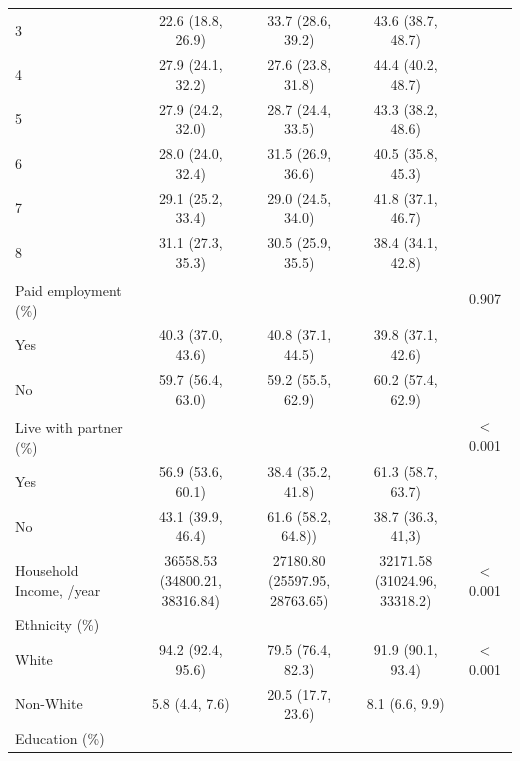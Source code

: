 \begin{table}[H]
\begin{tabular}[t]{lcccc}
	\hspace{1em}3 & 22.6 (18.8, 26.9) & 33.7 (28.6, 39.2) & 43.6 (38.7, 48.7) & \\
	\hspace{1em}4 & 27.9 (24.1, 32.2) & 27.6 (23.8, 31.8) & 44.4 (40.2, 48.7) & \\
	\hspace{1em}5 & 27.9 (24.2, 32.0) & 28.7 (24.4, 33.5) & 43.3 (38.2, 48.6) & \\
	\hspace{1em}6 & 28.0 (24.0, 32.4) & 31.5 (26.9, 36.6) & 40.5 (35.8, 45.3) & \\
	\hspace{1em}7 & 29.1 (25.2, 33.4) & 29.0 (24.5, 34.0) & 41.8 (37.1, 46.7) & \\
	\hspace{1em}8 & 31.1 (27.3, 35.3) & 30.5 (25.9, 35.5) & 38.4 (34.1, 42.8) & \\
	Paid employment\textsuperscript{\dag} (\%) &  &  &  & 0.907\\
	\hspace{1em}Yes & 40.3 (37.0, 43.6) & 40.8 (37.1, 44.5) & 39.8 (37.1, 42.6) & \\
	\hspace{1em}No & 59.7 (56.4, 63.0) & 59.2 (55.5, 62.9) & 60.2 (57.4, 62.9) & \\
	Live with partner\textsuperscript{\ddag} (\%) &  &  &  & < 0.001\\
	\hspace{1em}Yes & 56.9 (53.6, 60.1) & 38.4 (35.2, 41.8) & 61.3 (58.7, 63.7) & \\
	\hspace{1em}No & 43.1 (39.9, 46.4) & 61.6 (58.2, 64.8)) & 38.7 (36.3, 41,3) & \\
	Household Income, \textsterling/year & \Centerstack{36558.53\\(34800.21, 38316.84)} & \Centerstack{27180.80\\(25597.95, 28763.65)} & \Centerstack{32171.58\\(31024.96, 33318.2)} & < 0.001\\
	Ethnicity (\%) &  &  &  & \\
	\hspace{1em}White & 94.2 (92.4, 95.6) & 79.5 (76.4, 82.3) & 91.9 (90.1, 93.4) & < 0.001\\
	\hspace{1em}Non-White & 5.8 (4.4, 7.6) & 20.5 (17.7, 23.6) & 8.1 (6.6, 9.9) & \\
	Education (\%) &  &  &  & \\

\end{tabular}
\end{table}
